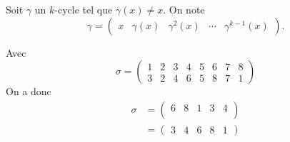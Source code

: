 \begin{rmk}[Notation]
	Soit $\gamma$ un $k$-cycle tel que $\gamma(x) \neq x$. On note \[
		\gamma = \begin{pmatrix}
			x & \gamma(x) & \gamma^2(x) & \cdots & \gamma^{k-1}(x)
		\end{pmatrix}.
	\] 
\end{rmk}

\begin{exm}
	Avec \[
		\sigma = \begin{pmatrix}
			1&2&3&4&5&6&7&8\\
			3&2&4&6&5&8&7&1
		\end{pmatrix}
	\]
	On a donc
	\begin{align*}
		\sigma &= \begin{pmatrix}
			6&8&1&3&4\\
		\end{pmatrix}\\
		&= \begin{pmatrix}
			3&4&6&8&1
		\end{pmatrix} \\
	\end{align*}
\end{exm}


